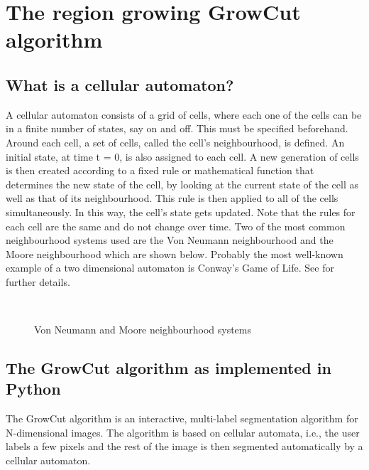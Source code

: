 \documentclass[a4paper,10pt]{article}
\begin{document}
\section{The region growing GrowCut algorithm}
\subsection{What is a cellular automaton?}
A cellular automaton consists of a grid of cells, where each one of the cells
can be in a finite number of states, say on and off.  This must be specified
beforehand.  Around each cell, a set of cells, called the cell's neighbourhood,
is defined.  An initial state, at time t = 0, is also assigned to each cell.  A
new generation of cells is then created according to a fixed rule or
mathematical function that determines the new state of the cell, by looking at
the current state of the cell as well as that of its neighbourhood.  This rule
is then applied to all of the cells simultaneously.  In this way, the cell's
state gets updated.  Note that the rules for each cell are the same and do not
change over time.  Two of the most common neighbourhood systems used are the Von
Neumann neighbourhood and the Moore neighbourhood which are shown below. 
Probably the most well-known example of a two dimensional automaton is Conway's
Game of Life.  See \cite{gol} for further details.

\begin{figure}[H]
\centering
\mbox{ \quad
{}} \caption{Von Neumann and
Moore neighbourhood systems \cite{n}}
\end{figure}

\subsection{The GrowCut algorithm as implemented in Python}
The GrowCut algorithm \cite{alg} is an interactive, multi-label segmentation
algorithm for N-dimensional images.  The algorithm is based on cellular
automata, i.e.,  the user labels a few pixels and the rest of the image is then
segmented automatically by a cellular automaton. \\
\end{document}
